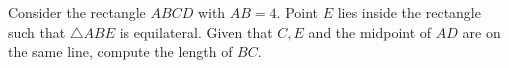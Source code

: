 Consider the rectangle $ABCD$ with $AB=4$. Point $E$ lies inside the rectangle such that $\triangle{ABE}$ is equilateral. Given that $C,E$ and the midpoint of $AD$ are on the same line, compute the length of $BC$.
